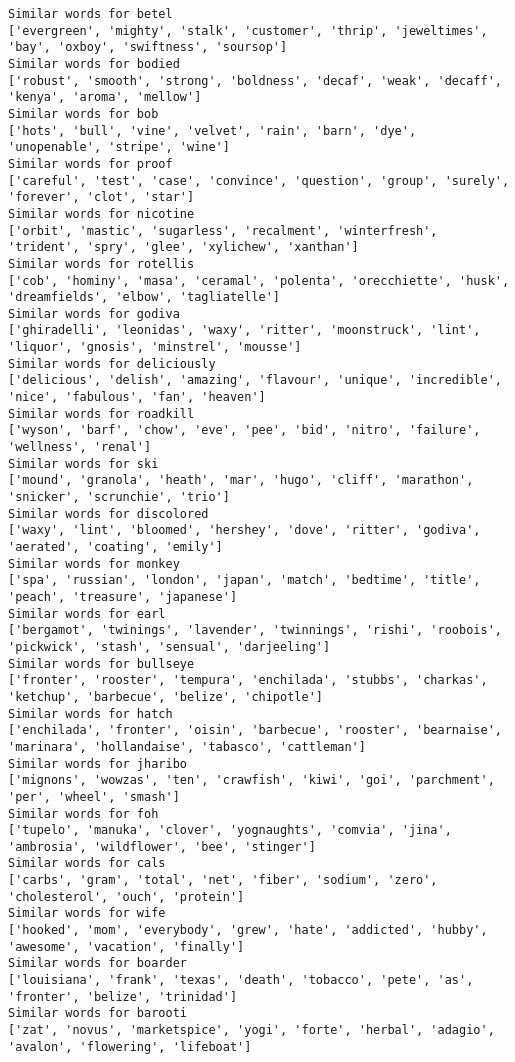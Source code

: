 \documentclass[11pt]{article}
\begin{document}
\begin{Verbatim}[commandchars=\\\{\}]
Similar words for betel
['evergreen', 'mighty', 'stalk', 'customer', 'thrip', 'jeweltimes', 'bay', 'oxboy', 'swiftness', 'soursop']
Similar words for bodied
['robust', 'smooth', 'strong', 'boldness', 'decaf', 'weak', 'decaff', 'kenya', 'aroma', 'mellow']
Similar words for bob
['hots', 'bull', 'vine', 'velvet', 'rain', 'barn', 'dye', 'unopenable', 'stripe', 'wine']
Similar words for proof
['careful', 'test', 'case', 'convince', 'question', 'group', 'surely', 'forever', 'clot', 'star']
Similar words for nicotine
['orbit', 'mastic', 'sugarless', 'recalment', 'winterfresh', 'trident', 'spry', 'glee', 'xylichew', 'xanthan']
Similar words for rotellis
['cob', 'hominy', 'masa', 'ceramal', 'polenta', 'orecchiette', 'husk', 'dreamfields', 'elbow', 'tagliatelle']
Similar words for godiva
['ghiradelli', 'leonidas', 'waxy', 'ritter', 'moonstruck', 'lint', 'liquor', 'gnosis', 'minstrel', 'mousse']
Similar words for deliciously
['delicious', 'delish', 'amazing', 'flavour', 'unique', 'incredible', 'nice', 'fabulous', 'fan', 'heaven']
Similar words for roadkill
['wyson', 'barf', 'chow', 'eve', 'pee', 'bid', 'nitro', 'failure', 'wellness', 'renal']
Similar words for ski
['mound', 'granola', 'heath', 'mar', 'hugo', 'cliff', 'marathon', 'snicker', 'scrunchie', 'trio']
Similar words for discolored
['waxy', 'lint', 'bloomed', 'hershey', 'dove', 'ritter', 'godiva', 'aerated', 'coating', 'emily']
Similar words for monkey
['spa', 'russian', 'london', 'japan', 'match', 'bedtime', 'title', 'peach', 'treasure', 'japanese']
Similar words for earl
['bergamot', 'twinings', 'lavender', 'twinnings', 'rishi', 'roobois', 'pickwick', 'stash', 'sensual', 'darjeeling']
Similar words for bullseye
['fronter', 'rooster', 'tempura', 'enchilada', 'stubbs', 'charkas', 'ketchup', 'barbecue', 'belize', 'chipotle']
Similar words for hatch
['enchilada', 'fronter', 'oisin', 'barbecue', 'rooster', 'bearnaise', 'marinara', 'hollandaise', 'tabasco', 'cattleman']
Similar words for jharibo
['mignons', 'wowzas', 'ten', 'crawfish', 'kiwi', 'goi', 'parchment', 'per', 'wheel', 'smash']
Similar words for foh
['tupelo', 'manuka', 'clover', 'yognaughts', 'comvia', 'jina', 'ambrosia', 'wildflower', 'bee', 'stinger']
Similar words for cals
['carbs', 'gram', 'total', 'net', 'fiber', 'sodium', 'zero', 'cholesterol', 'ouch', 'protein']
Similar words for wife
['hooked', 'mom', 'everybody', 'grew', 'hate', 'addicted', 'hubby', 'awesome', 'vacation', 'finally']
Similar words for boarder
['louisiana', 'frank', 'texas', 'death', 'tobacco', 'pete', 'as', 'fronter', 'belize', 'trinidad']
Similar words for barooti
['zat', 'novus', 'marketspice', 'yogi', 'forte', 'herbal', 'adagio', 'avalon', 'flowering', 'lifeboat']

\end{Verbatim}
\end{document}
